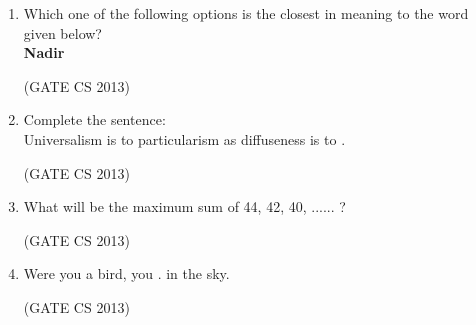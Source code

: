 \documentclass[a4paper, 11pt]{article}
\begin{document}
\begin{enumerate}
     \item Which one of the following options is the closest in meaning to the word given below? \\
     \textbf{Nadir }
     \begin{enumerate}
     \end{enumerate}
     \hfill (GATE CS 2013)

     \item Complete the sentence: \\ Universalism is to particularism as diffuseness is to \underline{\hspace{2cm}}.
     \begin{enumerate}
     \end{enumerate}
     \hfill (GATE CS 2013)

     \item What will be the maximum sum of 44, 42, 40, ...... ?
     \begin{enumerate}
     \end{enumerate}
     \hfill (GATE CS 2013)

     \item Were you a bird, you \underline{\hspace{2cm}}. in the sky. 
     \begin{enumerate}
     \end{enumerate}
     \hfill (GATE CS 2013)
     

\end{enumerate}
\end{document}
